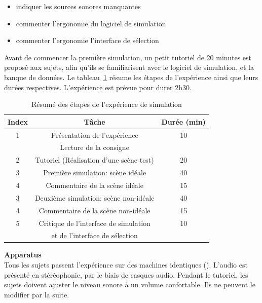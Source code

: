 \begin{itemize}
\item indiquer les sources sonores manquantes
\item commenter l’ergonomie du logiciel de simulation
\item commenter l’ergonomie l'interface de sélection
\end{itemize}

Avant de commencer la première simulation, un petit tutoriel de 20 minutes est proposé aux sujets, afin qu'ils se familiarisent avec le logiciel de simulation, et la banque de données. Le tableau~\ref{tab:indSimu} résume les étapes de l’expérience ainsi que leurs durées respectives. L'expérience est prévue pour durer 2h30. \\

\begin{table}[t]
\centering
\begin{tabular}{c c c} 
Index          & Tâche                               & Durée (min) \\                      
\hline
1 & Présentation de l'expérience                     & 10 \\
  & Lecture de la consigne                           &  \\
\hline
2 & Tutoriel (Réalisation d'une scène test)          & 20 \\
\hline
3 & Première simulation: scène idéale                & 40 \\
\hline
4  & Commentaire de la scène idéale                  & 15 \\
\hline
3 & Deuxième simulation: scène non-idéale            & 40  \\
\hline
4  & Commentaire de la scène non-idéale              & 15 \\
\hline
5 & Critique de l'interface de simulation            & 10 \\
  & et de l'interface de sélection                   & \\
\hline
\end{tabular}
\vspace{0.5mm}
\caption{Résumé des étapes de l’expérience de simulation}
\label{tab:indSimu}
\end{table}

\textbf{Apparatus} \\

Tous les sujets passent l'expérience sur des machines identiques (). L'audio est présenté en stéréophonie, par le biais de casques audio. Pendant le tutoriel, les sujets doivent ajuster le niveau sonore à un volume confortable. Ils ne peuvent le modifier par la suite.

